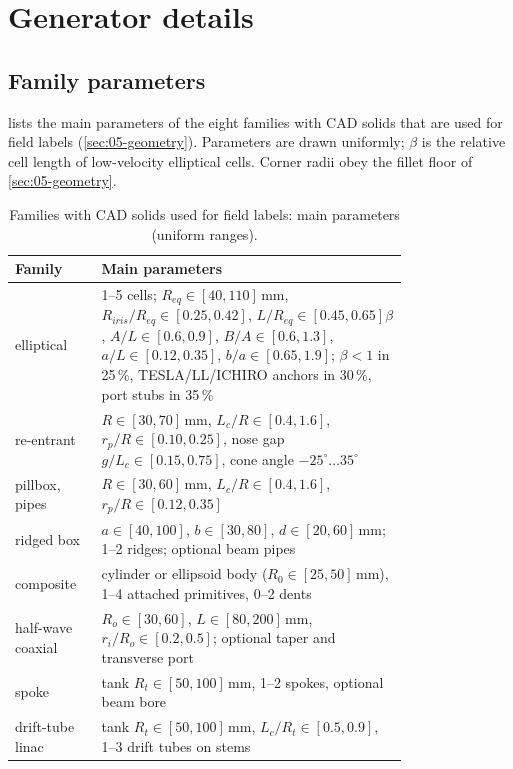 \section{Generator details}\label{sec:A05-generator}

\subsection{Family parameters}\label{sec:A05-families}

 lists the main parameters of the eight families with CAD solids that are used for field labels (\cref{sec:05-geometry}).
Parameters are drawn uniformly; $\beta$ is the relative cell length of low-velocity elliptical cells.
Corner radii obey the fillet floor of \cref{sec:05-geometry}.

\begin{table}[ht]
\centering
\caption{Families with CAD solids used for field labels: main parameters (uniform ranges).}
\label{tab:A05-families}
\small
\begin{tabular}{@{}l p{0.78\linewidth}@{}}
\toprule
Family & Main parameters \\
\midrule
elliptical & 1--5 cells; $R_{eq}\in[40,110]$\,mm, $R_{iris}/R_{eq}\in[0.25,0.42]$, $L/R_{eq}\in[0.45,0.65]\beta$, $A/L\in[0.6,0.9]$, $B/A\in[0.6,1.3]$, $a/L\in[0.12,0.35]$, $b/a\in[0.65,1.9]$; $\beta<1$ in 25\,\%, TESLA/LL/ICHIRO anchors in 30\,\%, port stubs in 35\,\% \\
re-entrant & $R\in[30,70]$\,mm, $L_c/R\in[0.4,1.6]$, $r_p/R\in[0.10,0.25]$, nose gap $g/L_c\in[0.15,0.75]$, cone angle $-25^\circ\ldots35^\circ$ \\
pillbox, pipes & $R\in[30,60]$\,mm, $L_c/R\in[0.4,1.6]$, $r_p/R\in[0.12,0.35]$ \\
ridged box & $a\in[40,100]$, $b\in[30,80]$, $d\in[20,60]$\,mm; 1--2 ridges; optional beam pipes \\
composite & cylinder or ellipsoid body ($R_0\in[25,50]$\,mm), 1--4 attached primitives, 0--2 dents \\
half-wave coaxial & $R_o\in[30,60]$, $L\in[80,200]$\,mm, $r_i/R_o\in[0.2,0.5]$; optional taper and transverse port \\
spoke & tank $R_t\in[50,100]$\,mm, 1--2 spokes, optional beam bore \\
drift-tube linac & tank $R_t\in[50,100]$\,mm, $L_c/R_t\in[0.5,0.9]$, 1--3 drift tubes on stems \\
\bottomrule
\end{tabular}
\end{table}

